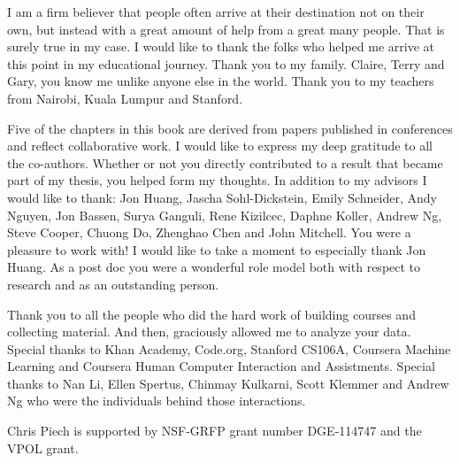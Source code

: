 
I am a firm believer that people often arrive at their destination not on their own, but instead with a great amount of help from a great many people. That is surely true in my case. 
I would like to thank the folks who helped me arrive at this point in my educational journey. Thank you to my family. Claire, Terry and Gary, you know me unlike anyone else in the world. Thank you to my teachers from Nairobi, Kuala Lumpur and Stanford. 

Five of the chapters in this book are derived from papers published in conferences and reflect collaborative work. I would like to express my deep gratitude to all the co-authors. Whether or not you directly contributed to a result that became part of my thesis, you helped form my thoughts. In addition to my advisors I would like to thank: Jon Huang, Jascha Sohl-Dickstein, Emily Schneider, Andy Nguyen, Jon Bassen, Surya Ganguli, Rene Kizilcec, Daphne Koller, Andrew Ng, Steve Cooper, Chuong Do, Zhenghao Chen and John Mitchell. You were a pleasure to work with! I would like to take a moment to especially thank Jon Huang. As a post doc you were a wonderful role model both with respect to research and as an outstanding person.

Thank you to all the people who did the hard work of building courses and collecting material. And then, graciously allowed me to analyze your data. Special thanks to Khan Academy, Code.org, Stanford CS106A, Coursera Machine Learning and Coursera Human Computer Interaction and Assistments. Special thanks to Nan Li, Ellen Spertus, Chinmay Kulkarni, Scott Klemmer and Andrew Ng who were the individuals behind those interactions. 

Chris Piech is supported by NSF-GRFP grant number DGE-114747 and the VPOL grant. 
